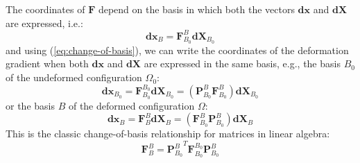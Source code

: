 \documentclass[letterpaper,12pt,oneside]{report}
\begin{document}
The coordinates of $\mathbf{F}$ depend on the basis in which both the vectors $\mathbf{dx}$ and $\mathbf{dX}$ are expressed, i.e.:
\begin{equation}
\mathbf{dx}_{B} = \mathbf{F}_{B_0}^B \mathbf{dX}_{B_0}
\label{eq:F_B0_B}
\end{equation}
and using (\ref{eq:change-of-basis}), we can write the coordinates of the deformation gradient when both $\mathbf{dx}$ and $\mathbf{dX}$ are expressed in the same basis, e.g., the basis $B_0$ of the undeformed configuration $\Omega_0$:
\begin{equation}
\mathbf{dx}_{B_0} = \mathbf{F}_{B_0}^{B_0} \mathbf{dX}_{B_0} = (\mathbf{P}_{B_0}^B\mathbf{F}_{B_0}^B) \mathbf{dX}_{B_0}
\label{eq:F_B0_B0}
\end{equation}
or the basis $B$ of the deformed configuration $\Omega$:
\begin{equation}
\mathbf{dx}_B = \mathbf{F}_B^B \mathbf{dX}_B = (\mathbf{F}_{B_0}^B \mathbf{P}_{B_0}^B) \mathbf{dX}_B
\label{eq:F_B_B}
\end{equation}
This is the classic change-of-basis relationship for matrices in linear algebra:
\begin{equation}
\mathbf{F}_B^B  = {\mathbf{P}_{B_0}^B}^T \mathbf{F}_{B_0}^{B_0} \mathbf{P}_{B_0}^B
\label{eq:change_basis_matrix}
\end{equation}
\end{document}

